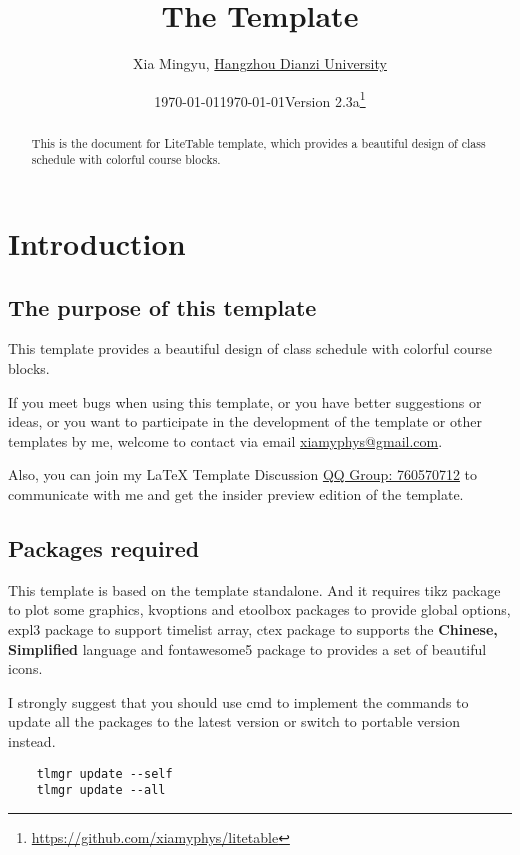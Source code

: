 \documentclass[11pt]{article}
\title{The \pkg{LiteTable} Template}
\author[1]{Xia Mingyu, \href{https://www.hdu.edu.cn}{Hangzhou Dianzi University}}
\date{\today}
\affil[1]{\href{mailto:xiamyphys@gmail.com}{\texttt{xiamyphys@gmail.com}}}
\date{\today\quad Version 2.3a\thanks{%
  \url{https://github.com/xiamyphys/litetable}}}
\def\pkg#1{\texorpdfstring{\textcolor{pkgcolor}{\textsf{#1}}}{“#1”}}
\def\cmd#1{\texorpdfstring{\textcolor{cmdcolor}{\textsf{#1}}}{“#1”}}
\begin{document}
\maketitle

\vspace{-2em}
\begin{abstract}
This is the document for \pkg{LiteTable} template, which provides a beautiful design of class schedule with colorful course blocks.

\end{abstract}

\tableofcontents\clearpage

\section{Introduction}

\subsection{The purpose of this template}
This template provides a beautiful design of class schedule with colorful course blocks.

If you meet bugs when using this template, or you have better suggestions or ideas, or you want to participate in the development of the template or other templates by me, welcome to contact via email \href{mailto:xiamyphys@gmail.com}{xiamyphys@gmail.com}.

Also, you can join my \textsf\LaTeX{} Template Discussion \href{https://qm.qq.com/q/OnHzbNvVAG}{QQ Group: 760570712} to communicate with me and get the insider preview edition of the template.

\subsection{Packages required}
This template is based on the template \pkg{standalone}. And it requires \pkg{tikz} package to plot some graphics, \pkg{kvoptions} and \pkg{etoolbox} packages to provide global options, \pkg{expl3} package to support \cmd{timelist} array, \pkg{ctex} package to supports the \textbf{Chinese, Simplified} language and \pkg{fontawesome5} package to provides a set of beautiful icons.

I strongly suggest that you should use cmd to implement the commands to update all the packages to the latest version or switch to portable version instead.
\begin{verbatim}
    tlmgr update --self
    tlmgr update --all
\end{verbatim}
\end{document}

